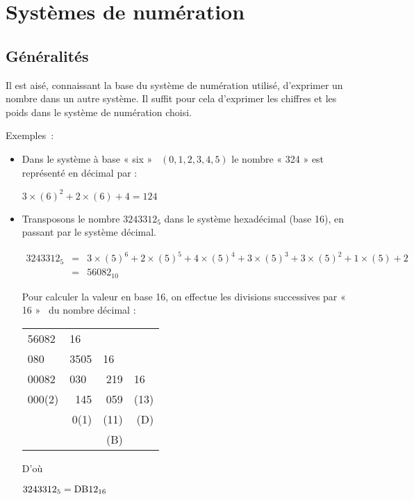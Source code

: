 \ifdefined\COMPLETE
\else
    
    
\fi
\chapter{Systèmes de numération}

\section{Généralités}

Il est aisé, connaissant la base du système de numération utilisé,
d'exprimer un nombre dans un autre système. Il suffit pour cela d'exprimer
les chiffres et les poids dans le système de numération choisi.

Exemples~:
\begin{itemize}
\item Dans le système à base « six » ~$(0,1,2,3,4,5)$ le nombre « 324 » est
représenté en décimal par :

\begin{center}
$3\times(6)^{2}+2\times(6)+4=124$
\end{center}
\item Transposons le nombre $3243312_{5}$ dans le système hexadécimal (base
16), en passant par le système décimal.

\begin{eqnarray*}
3243312_{5} & = & 3\times(5)^{6}+2\times(5)^{5}+4\times(5)^{4}+3\times(5)^{3}+3\times(5)^{2}+1\times(5)+2\\
 & = & 56082_{10}
\end{eqnarray*}

Pour calculer la valeur en base 16, on effectue les divisions successives
par « 16 » ~du nombre décimal :

\begin{center}
\begin{tabular}{lrrr}
56082  & \multicolumn{1}{|l}{16} &  & \tabularnewline
\cline{1-2} \cline{4-4} 
080  & 3505  & \multicolumn{1}{|l}{16} & \tabularnewline
\cline{1-1} \cline{3-3} 
00082  & \multicolumn{1}{l}{030} & 219  & \multicolumn{1}{|l}{16}\tabularnewline
\hline 
000(2)  & 145  & 059  & (13) \tabularnewline
 & 0(1)  & (11)  & (D) \tabularnewline
 &  & (B)  & \tabularnewline
\end{tabular}
\end{center}

D'où

\begin{center}
${\rm 3243312}_{5}={\rm DB12}_{16}$
\end{center}
\end{itemize}

